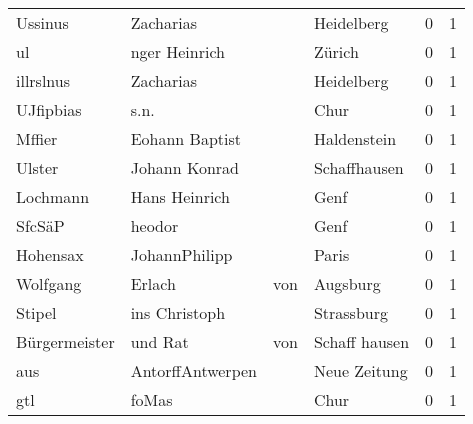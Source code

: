 \begin{tabular}{llllrr}
                  Ussinus &                          Zacharias &             &                                  Heidelberg &          0 &         1 \\
                       ul &                      nger Heinrich &             &                                      Zürich &          0 &         1 \\
                illrslnus &                          Zacharias &             &                                  Heidelberg &          0 &         1 \\
                UJfipbias &                               s.n. &             &                                        Chur &          0 &         1 \\
                   Mffier &                     Eohann Baptist &             &                                 Haldenstein &          0 &         1 \\
                   Ulster &                      Johann Konrad &             &                                Schaffhausen &          0 &         1 \\
                 Lochmann &                      Hans Heinrich &             &                                        Genf &          0 &         1 \\
                   SfcSäP &                             heodor &             &                                        Genf &          0 &         1 \\
                 Hohensax &                      JohannPhilipp &             &                                       Paris &          0 &         1 \\
                 Wolfgang &                             Erlach &         von &                                    Augsburg &          0 &         1 \\
                   Stipel &                      ins Christoph &             &                                  Strassburg &          0 &         1 \\
            Bürgermeister &                            und Rat &         von &                               Schaff hausen &          0 &         1 \\
                      aus &                   AntorffAntwerpen &             &                                Neue Zeitung &          0 &         1 \\
                      gtl &                              foMas &             &                                        Chur &          0 &         1 \\

\end{tabular}
